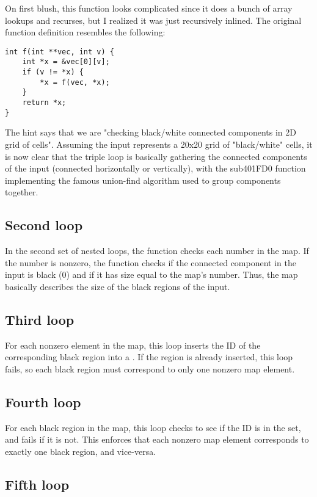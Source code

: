 \documentclass[a4paper,UTF8]{ctexart}
\begin{document}
On first blush, this function looks complicated since it does a bunch of array lookups and recurses, but I
realized it was just recursively inlined. The original function definition resembles the following:

\begin{verbatim}
int f(int **vec, int v) {
    int *x = &vec[0][v];
    if (v != *x) {
        *x = f(vec, *x);
    }
    return *x;
}
\end{verbatim}
  
The hint says that we are "checking black/white connected components in 2D grid of cells". Assuming the input represents a 20x20 grid of "black/white" cells, it is now clear that the triple loop is basically gathering the connected components of the input (connected horizontally or vertically), with the sub401FD0 function implementing the famous union-find algorithm used to group components together.

  \subsection{Second loop}

  In the second set of nested loops, the function checks each number in the map. If the number is nonzero, the
function checks if the connected component in the input is black (0) and if it has size equal to the map's
number. Thus, the map basically describes the size of the black regions of the input.

  \subsection{Third loop}

  For each nonzero element in the map, this loop inserts the ID of the corresponding black region into a . If the region is already inserted, this loop fails, so each black region must correspond to only one
nonzero map element.

  \subsection{Fourth loop}
  
  For each black region in the map, this loop checks to see if the ID is in the set, and fails if it is not. This
enforces that each nonzero map element corresponds to exactly one black region, and vice-versa.

  \subsection{Fifth loop}
  
\end{document}
